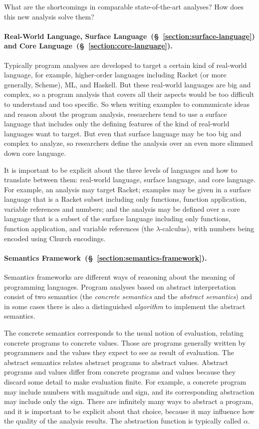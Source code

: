 \documentclass[12pt, oneside]{book}
\begin{document}
What are the shortcomings in comparable state-of-the-art analyses? How does this new analysis solve them?

\paragraph{Real-World Language, Surface Language~(§~\ref{section:surface-language}) and Core Language~(§~\ref{section:core-language}).}

Typically program analyses are developed to target a certain kind of real-world language, for example, higher-order languages including Racket (or more generally, Scheme), ML, and Haskell. But these real-world languages are big and complex, so a program analysis that covers all their aspects would be too difficult to understand and too specific. So when writing examples to communicate ideas and reason about the program analysis, researchers tend to use a surface language that includes only the defining features of the kind of real-world languages want to target. But even that surface language may be too big and complex to analyze, so researchers define the analysis over an even more slimmed down core language.
  
It is important to be explicit about the three levels of languages and how to translate between them: real-world language, surface language, and core language. For example, an analysis may target Racket; examples may be given in a surface language that is a Racket subset including only functions, function application, variable references and numbers; and the analysis may be defined over a core language that is a subset of the surface language including only functions, function application, and variable references (the \(λ\)-calculus), with numbers being encoded using Church encodings.

\paragraph{Semantics Framework~(§~\ref{section:semantics-framework}).}

Semantics frameworks are different ways of reasoning about the meaning of programming languages. Program analyses based on abstract interpretation consist of two semantics (the \emph{concrete semantics} and the \emph{abstract semantics}) and in some cases there is also a distinguished \emph{algorithm} to implement the abstract semantics.

The concrete semantics corresponds to the usual notion of evaluation, relating concrete programs to concrete values. Those are programs generally written by programmers and the values they expect to see as result of evaluation. The abstract semantics relates abstract programs to abstract values. Abstract programs and values differ from concrete programs and values because they discard some detail to make evaluation finite. For example, a concrete program may include numbers with magnitude and sign, and its corresponding abstraction may include only the sign. There are infinitely many ways to abstract a program, and it is important to be explicit about that choice, because it may influence how the quality of the analysis results. The abstraction function is typically called \(α\).
\end{document}

